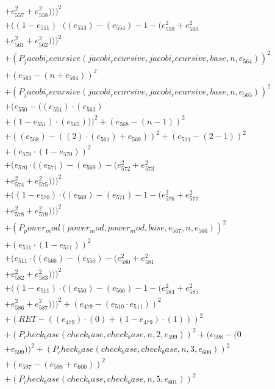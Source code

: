 \documentclass[10pt, a4paper]{article}
\begin{document}
\begin{align*}
& + e_{557}^{2} + e_{558}^{2})))^{2} \\
& + ((1 - e_{551})  \cdot  ((e_{553}) - (e_{554}) - 1 - (e_{559}^{2} + e_{560}^{2} \\
& + e_{561}^{2} + e_{562}^{2})))^{2} \\
& + (P_jacobi_recursive(jacobi_recursive, jacobi_recursive, base, n, e_{564}))^{2} \\
& + (e_{563} - (n + e_{564}))^{2} \\
& + (P_jacobi_recursive(jacobi_recursive, jacobi_recursive, base, n, e_{565}))^{2} \\
& + (e_{550} - ((e_{551})  \cdot  (e_{563}) \\
& + (1 - e_{551})  \cdot  (e_{565})))^{2} + (e_{568} - (n - 1))^{2} \\
& + ((e_{568}) - ((2)  \cdot  (e_{567}) + e_{569}))^{2} + (e_{571} - (2 - 1))^{2} \\
& + (e_{570}  \cdot  (1 - e_{570}))^{2} \\
& + (e_{570}  \cdot  ((e_{571}) - (e_{569}) - (e_{572}^{2} + e_{573}^{2} \\
& + e_{574}^{2} + e_{575}^{2})))^{2} \\
& + ((1 - e_{570})  \cdot  ((e_{569}) - (e_{571}) - 1 - (e_{576}^{2} + e_{577}^{2} \\
& + e_{578}^{2} + e_{579}^{2})))^{2} \\
& + (P_power_mod(power_mod, power_mod, base, e_{567}, n, e_{566}))^{2} \\
& + (e_{511}  \cdot  (1 - e_{511}))^{2} \\
& + (e_{511}  \cdot  ((e_{566}) - (e_{550}) - (e_{580}^{2} + e_{581}^{2} \\
& + e_{582}^{2} + e_{583}^{2})))^{2} \\
& + ((1 - e_{511})  \cdot  ((e_{550}) - (e_{566}) - 1 - (e_{584}^{2} + e_{585}^{2} \\
& + e_{586}^{2} + e_{587}^{2})))^{2} + (e_{479} - (e_{510}  \cdot  e_{511}))^{2} \\
& + (RET - ((e_{479})  \cdot  (0) + (1 - e_{479})  \cdot  (1)))^{2} \\
& + (P_check_base(check_base, check_base, n, 2, e_{599}))^{2} + (e_{598} - (0 \\
& + e_{599}))^{2} + (P_check_base(check_base, check_base, n, 3, e_{600}))^{2} \\
& + (e_{597} - (e_{598} + e_{600}))^{2} \\
& + (P_check_base(check_base, check_base, n, 5, e_{601}))^{2} \\

\end{align*}
\end{document}
